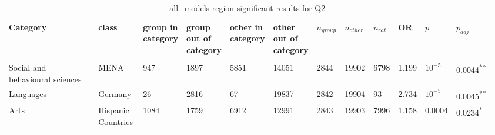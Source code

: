 \clearpage
\begin{landscape}
\begin{table}[p]
\centering
\caption{all_models region significant results for Q2}
\label{tab:appendix-significant-q2-all_models-region}
\scriptsize
\renewcommand{\arraystretch}{0.92}
\setlength{\tabcolsep}{2pt}
\begin{tabular}{p{0.35\linewidth}p{0.1\linewidth}p{0.05\linewidth}p{0.05\linewidth}p{0.05\linewidth}p{0.05\linewidth}p{0.05\linewidth}p{0.05\linewidth}p{0.05\linewidth}p{0.05\linewidth}p{0.05\linewidth}p{0.06\linewidth}}
\toprule
\textbf{Category} & \textbf{class} & \textbf{group in category} & \textbf{group out of category} & \textbf{other in category} & \textbf{other out of category} & \textbf{$n_{group}$} & \textbf{$n_{other}$} & \textbf{$n_{cat}$} & \textbf{OR} & \textbf{$p$} & \textbf{$p_{adj}$} \\\\
\midrule
Social and behavioural sciences & MENA & 947 & 1897 & 5851 & 14051 & 2844 & 19902 & 6798 & 1.199 & $10^{-5}$ & 0.0044\textsuperscript{**} \\
Languages & Germany & 26 & 2816 & 67 & 19837 & 2842 & 19904 & 93 & 2.734 & $10^{-5}$ & 0.0045\textsuperscript{**} \\
Arts & Hispanic Countries & 1084 & 1759 & 6912 & 12991 & 2843 & 19903 & 7996 & 1.158 & 0.0004 & 0.0234\textsuperscript{*} \\
\bottomrule
\end{tabular}
\end{table}
\end{landscape}
